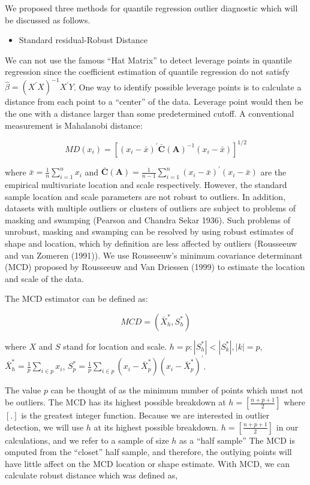 \documentclass[11pt,a4paper,]{article}
\providecommand{\tightlist}{%
  \setlength{\itemsep}{0pt}\setlength{\parskip}{0pt}}
\theoremstyle{definition}
\theoremstyle{definition}
\theoremstyle{remark}
\begin{document}
We proposed three methods for quantile regression outlier diagnostic
which will be discussed as follows.

\begin{itemize}
\tightlist
\item
  Standard residual-Robust Distance
\end{itemize}

We can not use the famous ``Hat Matrix'' to detect leverage points in
quantile regression since the coefficient estimation of quantile
regression do not satisfy \(\hat{\beta}=(X^{'}X)^{-1}X^{'}Y\). One way
to identify possible leverage points is to calculate a distance from
each point to a ``center'' of the data. Leverage point would then be the
one with a distance larger than some predetermined cutoff. A
conventional measurement is Mahalanobi distance:

\begin{equation}
MD(x_i) = [(x_i-\bar{x})^{'}\bar{\textbf{C}}(\textbf{A})^{-1}(x_i-\bar{x})]^{1/2}
\label{eq:distance}
\end{equation}

where \(\bar{x}=\frac{1}{n}\sum_{i=1}^{n}x_i\) and
\(\bar{\textbf{C}}(\textbf{A})=\frac{1}{n-1}\sum_{i=1}^{n}(x_i-\bar{x})^{'}(x_i-\bar{x})\)
are the empirical multivariate location and scale respectively. However,
the standard sample location and scale parameters are not robust to
outliers. In addition, datasets with multiple outliers or clusters of
outliers are subject to problems of masking and swamping (Pearson and
Chandra Sekar 1936). Such problems of unrobust, masking and swamping can
be resolved by using robust estimates of shape and location, which by
definition are less affected by outliers (Rousseeuw and van Zomeren
(1991)). We use Rousseeuw's minimum covariance determinant (MCD)
proposed by Rousseeuw and Van Driessen (1999) to estimate the location
and scale of the data.

The MCD estimator can be defined as:

\begin{equation}
MCD = (\bar{X}^{*}_{h}, S^{*}_{h})
\label{eq: mcd}
\end{equation}

where \(X\) and \(S\) stand for location and scale.
\(h={p: |S^{*}_{h}|<|S^{*}_{k}|,|k|=p}\),
\(\bar{X}^{*}_{h}=\frac{1}{p}\sum_{i \in p}x_{i}\),
\(S^{*}_{p}=\frac{1}{p}\sum_{i \in p}(x_i-\bar{X}^{*}_{p})(x_i-\bar{X}^{*}_{p})^{'}\).

The value \(p\) can be thought of as the minimum number of points which
must not be outliers. The MCD has its highest possible breakdown at
\(h=[\frac{n+p+1}{2}]\) where \([.]\) is the greatest integer function.
Because we are interested in outlier detection, we will use \(h\) at its
highest possible breakdown. \(h=[\frac{n+p+1}{2}]\) in our calculations,
and we refer to a sample of size \(h\) as a ``half sample'' The MCD is
omputed from the ``closet'' half sample, and therefore, the outlying
points will have little affect on the MCD location or shape estimate.
With MCD, we can calculate robust distance which was defined as,
\end{document}
